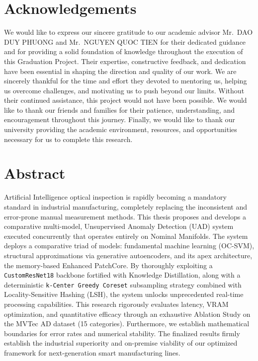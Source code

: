 \documentclass[12pt, a4paper, oneside]{report}
\begin{document}
\chapter*{Acknowledgements}

We would like to express our sincere gratitude to our academic advisor Mr.~DAO DUY PHUONG and Mr.~NGUYEN QUOC TIEN for their dedicated guidance and for providing a solid foundation of knowledge throughout the execution of this Graduation Project. Their expertise, constructive feedback, and dedication have been essential in shaping the direction and quality of our work. We are sincerely thankful for the time and effort they devoted to mentoring us, helping us overcome challenges, and motivating us to push beyond our limits. Without their continued assistance, this project would not have been possible. We would like to thank our friends and families for their patience, understanding, and encouragement throughout this journey. Finally, we would like to thank our university providing the academic environment, resources, and opportunities necessary for us to complete this research.

\chapter*{Abstract}

Artificial Intelligence optical inspection is rapidly becoming a mandatory standard in industrial manufacturing, completely replacing the inconsistent and error-prone manual measurement methods. This thesis proposes and develops a comparative multi-model, Unsupervised Anomaly Detection (UAD) system executed concurrently that operates entirely on Nominal Manifolds. The system deploys a comparative triad of models: fundamental machine learning (OC-SVM), structural approximations via generative autoencoders, and its apex architecture, the memory-based Enhanced PatchCore. By thoroughly exploiting a \texttt{CustomResNet18} backbone fortified with Knowledge Distillation, along with a deterministic \texttt{k-Center Greedy Coreset} subsampling strategy combined with Locality-Sensitive Hashing (LSH), the system unlocks unprecedented real-time processing capabilities. This research rigorously evaluates latency, VRAM optimization, and quantitative efficacy through an exhaustive Ablation Study on the MVTec AD dataset (15 categories). Furthermore, we establish mathematical boundaries for error rates and numerical stability. The finalized results firmly establish the industrial superiority and on-premise viability of our optimized framework for next-generation smart manufacturing lines.
\end{document}

